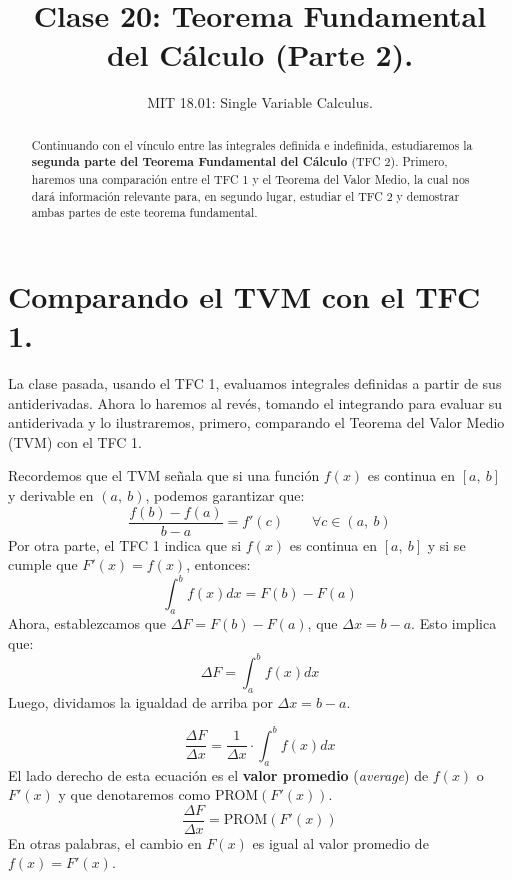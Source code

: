 \documentclass[12pt]{article}
\title{Clase 20: Teorema Fundamental del Cálculo (Parte 2).}
\author{MIT 18.01: Single Variable Calculus.}
\date{}
\begin{document}
\maketitle

\begin{abstract}
\noindent Continuando con el vínculo entre las integrales definida e indefinida, estudiaremos la \textbf{segunda parte del Teorema Fundamental del Cálculo} (TFC 2). Primero, haremos una comparación entre el TFC 1 y el Teorema del Valor Medio, la cual nos dará información relevante para, en segundo lugar, estudiar el TFC 2 y demostrar ambas partes de este teorema fundamental.
\end{abstract}

\section{Comparando el TVM con el TFC 1.}

La clase pasada, usando el TFC 1, evaluamos integrales definidas a partir de sus antiderivadas. Ahora lo haremos al revés, tomando el integrando para evaluar su antiderivada y lo ilustraremos, primero, comparando el Teorema del Valor Medio (TVM) con el TFC 1.

Recordemos que el TVM señala que si una función $f(x)$ es continua en $[a, \ b]$ y derivable en $(a, \ b)$, podemos garantizar que:
\[
  \frac{f(b) - f(a)}{b - a} = f'(c) \qquad \forall c \in (a, \ b)
\]
Por otra parte, el TFC 1 indica que si $f(x)$ es continua en $[a, \ b]$ y si se cumple que $F'(x) = f(x)$, entonces:
\[
  \int_{a}^{b} f(x)dx = F(b) - F(a)
\]
Ahora, establezcamos que $\Delta F = F(b) - F(a)$, que $\Delta x = b - a$. Esto implica que:
\[
  \Delta F = \int_{a}^{b} f(x)dx
\]
Luego, dividamos la igualdad de arriba por $\Delta x = b - a$.

\[
  \frac{\Delta F}{\Delta x} = \frac{1}{\Delta x} \cdot \int_{a}^{b} f(x)dx
\]
El lado derecho de esta ecuación es el \textbf{valor promedio} (\textit{average}) de $f(x)$ o $F'(x)$ y que denotaremos como PROM$(F'(x))$.
\[
  \frac{\Delta F}{\Delta x} = \text{PROM}(F'(x))
\]
En otras palabras, el cambio en $F(x)$ es igual al valor promedio de $f(x) = F'(x)$.
\end{document}
